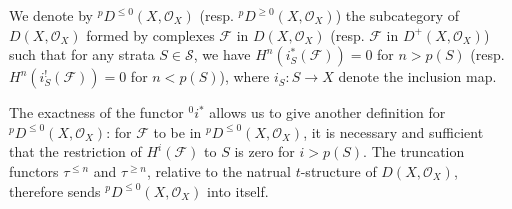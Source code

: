 \begin{definition}
We denote by ${^p\!D^{\leq 0}}(X,\mathscr{O}_X)$ (resp. ${^p\!D^{\geq 0}}(X,\mathscr{O}_X)$) the subcategory of $D(X,\mathscr{O}_X)$ formed by complexes $\mathscr{F}$ in $D(X,\mathscr{O}_X)$ (resp. $\mathscr{F}$ in $D^+(X,\mathscr{O}_X)$) such that for any strata $S\in\mathcal{S}$, we have $H^n(i_S^*(\mathscr{F}))=0$ for $n>p(S)$ (resp. $H^n(i_S^!(\mathscr{F}))=0$ for $n<p(S)$), where $i_S:S\to X$ denote the inclusion map.
\end{definition}

The exactness of the functor ${^0i^*}$ allows us to give another definition for ${^p\!D^{\leq 0}(X,\mathscr{O}_X)}$: for $\mathscr{F}$ to be in ${^p\!D^{\leq 0}}(X,\mathscr{O}_X)$, it is necessary and sufficient that the restriction of $H^i(\mathscr{F})$ to $S$ is zero for $i>p(S)$. The truncation functors $\tau^{\leq n}$ and $\tau^{\geq n}$, relative to the natrual $t$-structure of $D(X,\mathscr{O}_X)$, therefore sends ${^p\!D^{\leq 0}}(X,\mathscr{O}_X)$ into itself.

